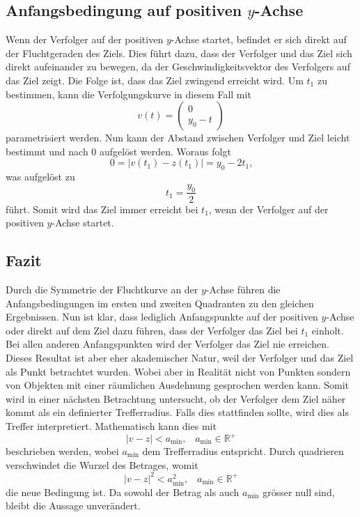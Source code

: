 \subsection{Anfangsbedingung auf positiven $y$-Achse}
Wenn der Verfolger auf der positiven $y$-Achse startet, befindet er sich direkt auf der Fluchtgeraden des Ziels.
Dies führt dazu, dass der Verfolger und das Ziel sich direkt aufeinander zu bewegen, da der Geschwindigkeitsvektor des Verfolgers auf das Ziel zeigt.
Die Folge ist, dass das Ziel zwingend erreicht wird.
Um $t_1$ zu bestimmen, kann die Verfolgungskurve in diesem Fall mit
%
\begin{equation}
    v(t)
    =
    \left( \begin{array}{c} 0 \\ y_0-t \end{array} \right)
\end{equation}
%
parametrisiert werden.
Nun kann der Abstand zwischen Verfolger und Ziel leicht bestimmt und nach 0 aufgelöst werden.
Woraus folgt
%
\begin{equation}
    0
    =
    |v(t_1)-z(t_1)|
    =
    y_0-2t_1\text{,}
\end{equation}
%
was aufgelöst zu
%
\begin{equation}
    t_1
    =
    \frac{y_0}{2}
\end{equation}
%
führt.
Somit wird das Ziel immer erreicht bei $t_1$, wenn der Verfolger auf der positiven $y$-Achse startet.
\subsection{Fazit}
Durch die Symmetrie der Fluchtkurve an der $y$-Achse führen die Anfangsbedingungen im ersten und zweiten Quadranten zu den gleichen Ergebnissen. Nun ist klar, dass lediglich Anfangspunkte auf der positiven $y$-Achse oder direkt auf dem Ziel dazu führen, dass der Verfolger das Ziel bei $t_1$ einholt.
Bei allen anderen Anfangspunkten wird der Verfolger das Ziel nie erreichen.
Dieses Resultat ist aber eher akademischer Natur, weil der Verfolger und das Ziel als Punkt betrachtet wurden.
Wobei aber in Realität nicht von Punkten sondern von Objekten mit einer räumlichen Ausdehnung gesprochen werden kann.
Somit wird in einer nächsten Betrachtung untersucht, ob der Verfolger dem Ziel näher kommt als ein definierter Trefferradius.
Falls dies stattfinden sollte, wird dies als Treffer interpretiert.
Mathematisch kann dies mit
%
\begin{equation}
    |v-z|<a_{\text{min}} \text{,}\quad a_{\text{min}}\in\mathbb{R}^+
\end{equation}
%
beschrieben werden, wobei $a_{\text{min}}$ dem Trefferradius entspricht.
Durch quadrieren verschwindet die Wurzel des Betrages, womit
%
\begin{equation}
    |v-z|^2<a_{\text{min}}^2 \text{,}\quad a_{\text{min}}\in \mathbb{R}^+
    \label{lambertw:minimumAbstand}
\end{equation}
%
die neue Bedingung ist.
Da sowohl der Betrag als auch $a_{\text{min}}$ grösser null sind, bleibt die Aussage unverändert.
%
